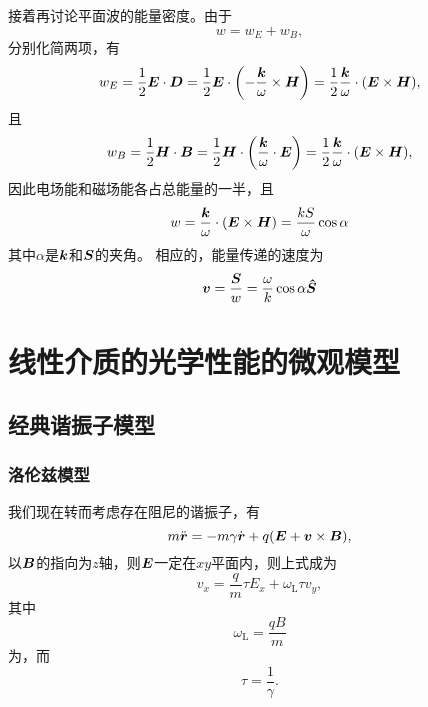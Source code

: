 接着再讨论平面波的能量密度。由于
\[
    w = w_E + w_B,
\]
分别化简两项，有
\[
    w_E = \frac{1}{2} \vb*{E} \cdot \vb*{D} 
        = \frac{1}{2} \vb*{E} \cdot \left( - \frac{\vb*{k}}{\omega} \times \vb*{H} \right) 
        = \frac{1}{2} \frac{\vb*{k}}{\omega} \cdot (\vb*{E} \times \vb*{H}),
\]
且
\[
    w_B = \frac{1}{2} \vb*{H} \cdot \vb*{B} 
        = \frac{1}{2} \vb*{H} \cdot \left( \frac{\vb*{k}}{\omega} \cdot \vb*{E} \right) 
        = \frac{1}{2} \frac{\vb*{k}}{\omega} \cdot (\vb*{E} \times \vb*{H}),
\]
因此电场能和磁场能各占总能量的一半，且
\begin{equation}
    w = \frac{\vb*{k}}{\omega} \cdot (\vb*{E} \times \vb*{H}) = \frac{k S}{\omega} \cos \alpha
    \label{eq:energy-density-and-s}
\end{equation}
其中$\alpha$是$\vb*{k}$和$\vb*{S}$的夹角。
相应的，能量传递的速度为
\begin{equation}
    \vb*{v} = \frac{\vb*{S}}{w} = \frac{\omega}{k}  \cos \alpha \vu*{S}
\end{equation}


\section{线性介质的光学性能的微观模型}

\subsection{经典谐振子模型}

\subsubsection{洛伦兹模型}

我们现在转而考虑存在阻尼的谐振子，有
\begin{equation}
    m \ddot{\vb*{r}} = - m \gamma \dot {\vb*{r}} + q (\vb*{E} + \vb*{v} \times \vb*{B}),
\end{equation}
以$\vb*{B}$的指向为$z$轴，则$\vb*{E}$一定在$xy$平面内，则上式成为%
\begin{equation}
    v_x = \frac{q}{m} \tau E_x + \omega_\text{L} \tau v_y,
\end{equation}
其中
\begin{equation}
    \omega_\text{L} = \frac{qB}{m}
\end{equation}
为，而
\begin{equation}
    \tau = \frac{1}{\gamma}.
\end{equation}

